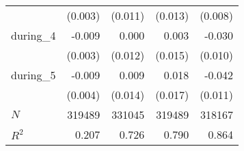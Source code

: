 {\begin{tabular}{l*{4}{D{.}{.}{-1}}}
            &     (0.003)         &     (0.011)         &     (0.013)         &     (0.008)         \\
[1em]
during\_4    &      -0.009\sym{***}&       0.000         &       0.003         &      -0.030\sym{***}\\
            &     (0.003)         &     (0.012)         &     (0.015)         &     (0.010)         \\
[1em]
during\_5    &      -0.009\sym{**} &       0.009         &       0.018         &      -0.042\sym{***}\\
            &     (0.004)         &     (0.014)         &     (0.017)         &     (0.011)         \\
\hline
\(N\)       &      319489         &      331045         &      319489         &      318167         \\
\(R^{2}\)   &       0.207         &       0.726         &       0.790         &       0.864         \\
\hline\hline
\end{tabular}
}
